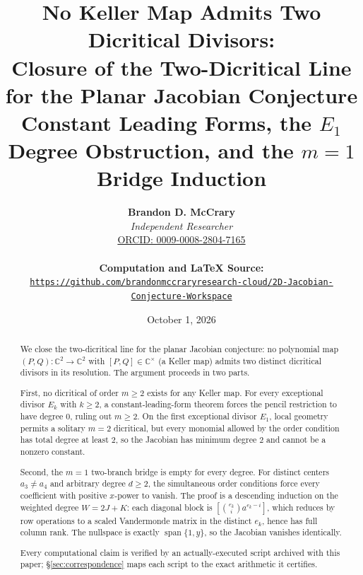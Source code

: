 \documentclass[a4paper,11pt]{article}
\theoremstyle{plain}
\theoremstyle{definition}
\theoremstyle{remark}
\begin{document}
\title{\textbf{\Large No Keller Map Admits Two Dicritical Divisors:}\\[0.6em]
\large Closure of the Two-Dicritical Line for the Planar Jacobian Conjecture\\[0.4em]
\normalsize Constant Leading Forms, the $E_1$ Degree Obstruction, and the $m=1$ Bridge Induction}
\author{\textbf{Brandon D. McCrary}\\[0.25em]
\textit{Independent Researcher}\\[0.25em]
\href{https://orcid.org/0009-0008-2804-7165}{ORCID: 0009-0008-2804-7165}\\[0.6em]
{\small \parbox{0.92\textwidth}{\centering \textbf{Computation and LaTeX Source:}\\
{\color{neonmagenta}\hypersetup{urlcolor=neonmagenta}\href{https://github.com/brandonmccraryresearch-cloud/2D-Jacobian-Conjecture-Workspace}{\nolinkurl{https://github.com/brandonmccraryresearch-cloud/2D-Jacobian-Conjecture-Workspace}}}}}}
\date{October 1, 2026}
\maketitle

\begin{abstract}
We close the two-dicritical line for the planar Jacobian conjecture: no polynomial map $(P,Q):\mathbb{C}^2\to\mathbb{C}^2$ with $[P,Q]\in\mathbb{C}^\times$ (a Keller map) admits two distinct dicritical divisors in its resolution. The argument proceeds in two parts.

First, no dicritical of order $m\geq 2$ exists for any Keller map. For every exceptional divisor $E_k$ with $k\geq 2$, a constant-leading-form theorem forces the pencil restriction to have degree $0$, ruling out $m\geq 2$. On the first exceptional divisor $E_1$, local geometry permits a solitary $m=2$ dicritical, but every monomial allowed by the order condition has total degree at least $2$, so the Jacobian has minimum degree $2$ and cannot be a nonzero constant.

Second, the $m=1$ two-branch bridge is empty for every degree. For distinct centers $a_3\neq a_4$ and arbitrary degree $d\geq 2$, the simultaneous order conditions force every coefficient with positive $x$-power to vanish. The proof is a descending induction on the weighted degree $W=2J+K$: each diagonal block is $[\binom{e_k}{i}a^{e_k-i}]$, which reduces by row operations to a scaled Vandermonde matrix in the distinct $e_k$, hence has full column rank. The nullspace is exactly $\operatorname{span}\{1,y\}$, so the Jacobian vanishes identically.

Every computational claim is verified by an actually-executed script archived with this paper; \S\ref{sec:correspondence} maps each script to the exact arithmetic it certifies.
\end{abstract}
\end{document}

